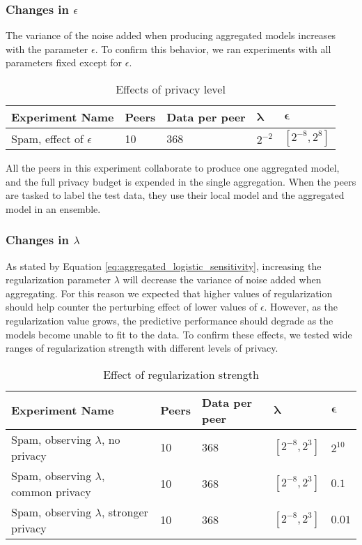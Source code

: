 \subsubsection{Changes in $\epsilon$}

The variance of the noise added when producing aggregated models increases with the parameter $\epsilon$. To confirm this behavior, we ran experiments with all parameters fixed except for $\epsilon$.

\begin{table}[h]
	\centering
	\begin{tabular}{|l|l|l|l|l|}
		\textbf{Experiment Name}            & \textbf{Peers} & \textbf{Data per peer} &
		 $\boldsymbol{\lambda}$ & $\boldsymbol{\epsilon}$                                              \\
		 \hline
		Spam, effect of $\epsilon$ & 10    & 368  & $2^{-2}$  & $[2^{-8}, 2^{8}]$
	\end{tabular}
	\caption{Effects of privacy level}
	\label{tab:experiments_privacy_level}
\end{table}

All the peers in this experiment collaborate to produce one aggregated model, and the full privacy budget is expended in the single aggregation. When the peers are tasked to label the test data, they use their local model and the aggregated model in an ensemble.

\subsubsection{Changes in $\lambda$}

As stated by Equation \ref{eq:aggregated_logistic_sensitivity},  increasing the regularization parameter $\lambda$ will decrease the variance of noise added when aggregating. For this reason we expected that higher values of regularization should help counter the perturbing effect of lower values of $\epsilon$. However, as the regularization value grows, the predictive performance should degrade as the models become unable to fit to the data. To confirm these effects, we tested wide ranges of regularization strength with different levels of privacy.

\begin{table}[h]
	\centering
	\begin{tabular}{|l|l|l|l|l|}
		\textbf{Experiment Name}    & \textbf{Peers} & \textbf{Data per peer} & $\boldsymbol{\lambda}$         & $\boldsymbol{\epsilon}$ \\
		\hline
		Spam, observing $\lambda$, no privacy       & 10    & 368  & $[2^{-8}, 2^{3}]$ & $2^{10}$   \\
		Spam, observing $\lambda$, common privacy   & 10    & 368  & $[2^{-8}, 2^{3}]$ & $0.1$      \\
		Spam, observing $\lambda$, stronger privacy & 10    & 368  & $[2^{-8}, 2^{3}]$ & $0.01$    
	\end{tabular}
	\caption{Effect of regularization strength}
	\label{tab:experiments_regularization_strength}
\end{table}

